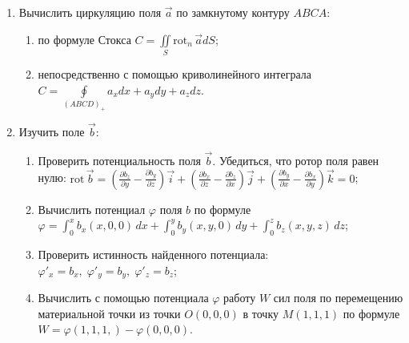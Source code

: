 \documentclass[14pt,a4paper,final]{extreport}
\begin{document}
\begin{enumerate}[label=\arabic*.]
\begin{enumerate}[label=\theenumi\arabic*]
		\item Вычислить поток непосредственно через поверхностный интеграл\\ \( P = \iint\limits_S xzdydz + xydzdx + yzdxdy \).
	\end{enumerate}
	
	\item Вычислить циркуляцию поля \( \vec a \) по замкнутому контуру \( ABCA \):

\pagebreak %
	
	\begin{enumerate}[label=\theenumi\arabic*]
		\item по формуле Стокса \( C = \iint\limits_S \mathrm{rot}_n \, \vec a dS \);
		
		\item непосредственно с помощью криволинейного интеграла \( C = \oint\limits_{(ABCD)_+}{a_xdx + a_ydy + a_zdz} \).
	\end{enumerate}
	
	\item Изучить поле \( \vec b \):
	
	\begin{enumerate}[label=\theenumi\arabic*]
		\item Проверить потенциальность поля \( \vec b \). Убедиться, что ротор поля равен нулю: \( \mathrm{rot} \, \vec b = (\frac{\partial b_z}{\partial y} - \frac{\partial b_y}{\partial z})\vec i + (\frac{\partial b_x}{\partial z} - \frac{\partial b_z}{\partial x})\vec j + (\frac{\partial b_y}{\partial x} - \frac{\partial b_x}{\partial y})\vec k = 0 \);
		
		\item Вычислить потенциал \( \varphi \) поля \( b \) по формуле \( \varphi = \int_0^x{b_x(x,0,0)\,dx} + \int_0^y{b_y(x,y,0)\,dy} +\int_0^z{b_z(x,y,z)\,dz} \);
		
		\item Проверить истинность найденного потенциала: \\\( \varphi'_x = b_x\mathrm{,}\;\varphi'_y = b_y\mathrm{,}\;\varphi'_z = b_z \);
		
		\item Вычислить с помощью потенциала \( \varphi \) работу \( W \) сил поля по перемещению материальной точки из точки \(O(0,0,0) \) в точку \( M(1,1,1) \) по формуле $W = \varphi(1, 1, 1,) - \varphi(0, 0, 0)$.
	\end{enumerate}

\addtocounter{page}{0}
\fancyhead[C]{\bfseries\thepage\\\docstamp}  %
	

\end{enumerate}
\end{document}
